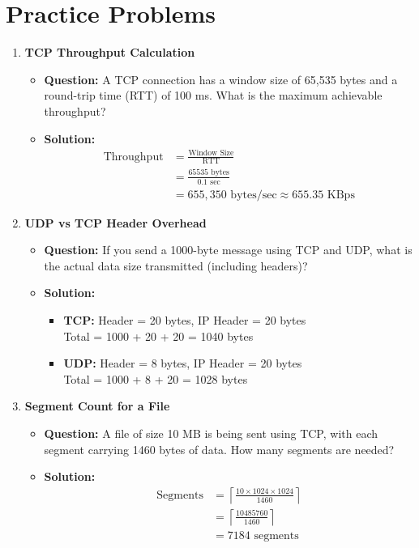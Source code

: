 \section{Practice Problems}
\begin{enumerate}
   \item \textbf{TCP Throughput Calculation}
   \begin{itemize}
       \item \textbf{Question:} A TCP connection has a window size of 65,535 bytes and a round-trip time (RTT) of 100 ms. What is the maximum achievable throughput?
       \item \textbf{Solution:} 
       \begin{align*}
           \text{Throughput} &= \frac{\text{Window Size}}{\text{RTT}} \\
           &= \frac{65535 \text{ bytes}}{0.1 \text{ sec}} \\
           &= 655,350 \text{ bytes/sec} \approx 655.35 \text{ KBps}
       \end{align*}
   \end{itemize}

   \pagebreak
   \item \textbf{UDP vs TCP Header Overhead}
   \begin{itemize}
       \item \textbf{Question:} If you send a 1000-byte message using TCP and UDP, what is the actual data size transmitted (including headers)?
       \item \textbf{Solution:}
       \begin{itemize}
           \item \textbf{TCP:} Header = 20 bytes, IP Header = 20 bytes \\
           Total = 1000 + 20 + 20 = 1040 bytes
           \item \textbf{UDP:} Header = 8 bytes, IP Header = 20 bytes \\
           Total = 1000 + 8 + 20 = 1028 bytes
       \end{itemize}
   \end{itemize}

   \item \textbf{Segment Count for a File}
   \begin{itemize}
       \item \textbf{Question:} A file of size 10 MB is being sent using TCP, with each segment carrying 1460 bytes of data. How many segments are needed?
       \item \textbf{Solution:}
       \begin{align*}
           \text{Segments} &= \left\lceil\frac{10 \times 1024 \times 1024}{1460}\right\rceil \\
           &= \left\lceil\frac{10485760}{1460}\right\rceil \\
           &= 7184 \text{ segments}
       \end{align*}
   \end{itemize}


\end{enumerate}
